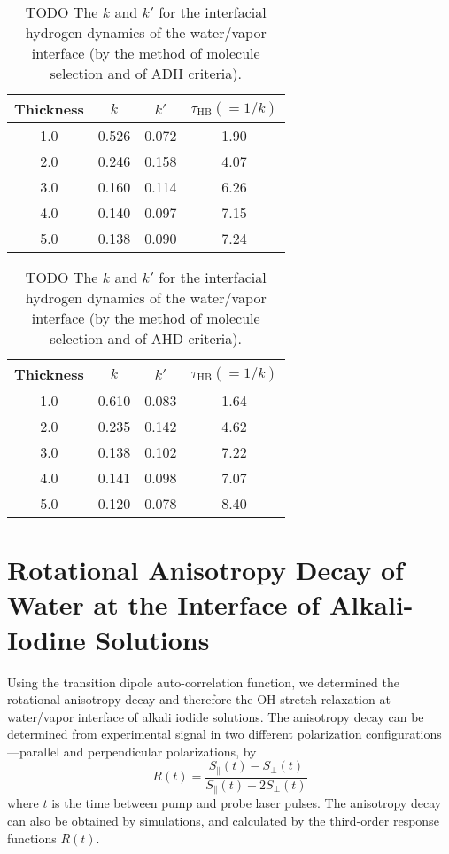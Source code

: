 \begin{table}[H]
\centering
\caption{\label{tab:k_k_prime_tau_128w_pure_ihb_scheme1_ADH} 
    TODO The $k$ and $k'$ for the interfacial hydrogen dynamics of the water/vapor interface (by the method of molecule selection and of ADH criteria).} 
\begin{tabular}{cccc}
 Thickness & $k$ & $k'$ & $\tau_{\text{HB}} (=1/k)$ \\
\hline
  1.0 & 0.526 & 0.072 & 1.90  \\
  2.0 & 0.246 & 0.158 & 4.07  \\
  3.0 & 0.160 & 0.114 & 6.26  \\
  4.0 & 0.140 & 0.097 & 7.15  \\
  5.0 & 0.138 & 0.090 & 7.24  \\
\end{tabular}
\end{table}
\begin{table}[H]
\centering
\caption{\label{tab:k_k_prime_tau_128w_pure_ihb_AHD} 
    TODO The $k$ and $k'$ for the interfacial hydrogen dynamics of the water/vapor interface (by the method of molecule selection and of AHD criteria).} 
\begin{tabular}{cccc}
 Thickness & $k$ & $k'$ & $\tau_{\text{HB}} (=1/k)$ \\
\hline
  1.0 & 0.610 & 0.083 & 1.64  \\
  2.0 & 0.235 & 0.142 & 4.62  \\
  3.0 & 0.138 & 0.102 & 7.22  \\
  4.0 & 0.141 & 0.098 & 7.07  \\
  5.0 & 0.120 & 0.078 & 8.40  \\
\end{tabular}
\end{table}

\section{Rotational Anisotropy Decay of Water at the Interface of Alkali-Iodine Solutions}\label{RAD}
Using the transition dipole auto-correlation function, 
we determined the rotational anisotropy decay and therefore the OH-stretch relaxation at water/vapor interface of alkali iodide solutions.
The anisotropy decay can be determined from experimental signal in two different polarization configurations---parallel and perpendicular polarizations, by 
\begin{equation}
        R(t)=\frac{S_{\parallel}(t)-S_{\perp}(t)}{S_{\parallel}(t)+2S_{\perp}(t)}
\label{eq:ad}
\end{equation}
where $t$ is the time between pump and probe laser pulses.  The anisotropy decay can also be obtained by simulations, and calculated by the third-order response functions $R(t)$. \cite{Jansen10,Jansen06}
%

